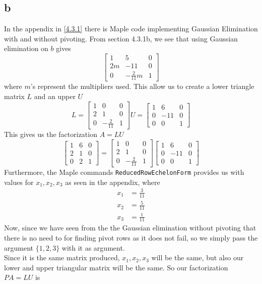 \documentclass[12pt]{article}
\begin{document}
\subsection*{b}
In the appendix in \ref{4.3.1} there is Maple code implementing Gaussian Elimination with and without pivoting. From section 4.3.1b, we see that using Gaussian elimination on $b$ gives
$$
\begin{bmatrix}
1 & 5 & 0\\
2m & -11 & 0 \\
0 & -\frac{2}{11}m & 1 
\end{bmatrix}
$$
where $m$'s represent the multipliers used. This allow us to create a lower triangle matrix $L$ and an upper $U$
$$
L
=
\begin{bmatrix}
1 & 0 & 0\\
2 & 1 & 0 \\
0 & -\frac{2}{11} & 1 
\end{bmatrix}
U
=
\begin{bmatrix}
1 & 6 & 0\\
0 & -11 & 0 \\
0 & 0 & 1 
\end{bmatrix}
$$
This gives us the factorization $A=LU$
$$
\begin{bmatrix}
1 & 6 & 0\\
2 & 1 & 0 \\
0 & 2 & 1 
\end{bmatrix}
=
\begin{bmatrix}
1 & 0 & 0\\
2 & 1 & 0 \\
0 & -\frac{2}{11} & 1 
\end{bmatrix}
\begin{bmatrix}
1 & 6 & 0\\
0 & -11 & 0 \\
0 & 0 & 1 
\end{bmatrix}
$$
Furthermore, the Maple commands \texttt{ReducedRowEchelonForm} provides us with values for $x_1,x_2,x_3$ as seen in the appendix, where
\begin{align*}
x_1&=\frac{3}{11} \\
x_2&=\frac{5}{11} \\
x_3&=\frac{1}{11}
\end{align*}
Now, since we have seen from the the Gaussian elimination without pivoting that there is no need to for finding pivot rows as it does not fail, so we simply pass the argument $\{1,2,3\}$ with it as argument.\\
Since it is the same matrix produced, $x_1,x_2,x_3$ will be the same, but also our lower and upper triangular matrix will be the same. So our factorization $PA=LU$ is
\end{document}
